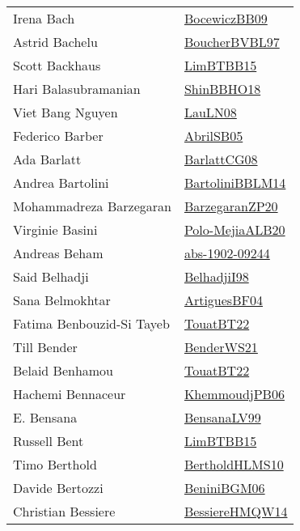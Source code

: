 {\begin{longtable}{p{4cm}p{20cm}}
Irena Bach & \href{}{BocewiczBB09}\cite{BocewiczBB09} \\
Astrid Bachelu & \href{}{BoucherBVBL97}\cite{BoucherBVBL97} \\
Scott Backhaus & \href{papers/LimBTBB15.pdf}{LimBTBB15}\cite{LimBTBB15} \\
Hari Balasubramanian & \href{articles/ShinBBHO18.pdf}{ShinBBHO18}\cite{ShinBBHO18} \\
Viet Bang Nguyen & \href{papers/LauLN08.pdf}{LauLN08}\cite{LauLN08} \\
Federico Barber & \href{papers/AbrilSB05.pdf}{AbrilSB05}\cite{AbrilSB05} \\
Ada Barlatt & \href{papers/BarlattCG08.pdf}{BarlattCG08}\cite{BarlattCG08} \\
Andrea Bartolini & \href{papers/BartoliniBBLM14.pdf}{BartoliniBBLM14}\cite{BartoliniBBLM14} \\
Mohammadreza Barzegaran & \href{papers/BarzegaranZP20.pdf}{BarzegaranZP20}\cite{BarzegaranZP20} \\
Virginie Basini & \href{}{Polo-MejiaALB20}\cite{Polo-MejiaALB20} \\
Andreas Beham & \href{articles/abs-1902-09244.pdf}{abs-1902-09244}\cite{abs-1902-09244} \\
Said Belhadji & \href{articles/BelhadjiI98.pdf}{BelhadjiI98}\cite{BelhadjiI98} \\
Sana Belmokhtar & \href{papers/ArtiguesBF04.pdf}{ArtiguesBF04}\cite{ArtiguesBF04} \\
Fatima Benbouzid{-}Si Tayeb & \href{}{TouatBT22}\cite{TouatBT22} \\
Till Bender & \href{papers/BenderWS21.pdf}{BenderWS21}\cite{BenderWS21} \\
Belaid Benhamou & \href{}{TouatBT22}\cite{TouatBT22} \\
Hachemi Bennaceur & \href{papers/KhemmoudjPB06.pdf}{KhemmoudjPB06}\cite{KhemmoudjPB06} \\
E. Bensana & \href{articles/BensanaLV99.pdf}{BensanaLV99}\cite{BensanaLV99} \\
Russell Bent & \href{papers/LimBTBB15.pdf}{LimBTBB15}\cite{LimBTBB15} \\
Timo Berthold & \href{papers/BertholdHLMS10.pdf}{BertholdHLMS10}\cite{BertholdHLMS10} \\
Davide Bertozzi & \href{papers/BeniniBGM06.pdf}{BeniniBGM06}\cite{BeniniBGM06} \\
Christian Bessiere & \href{papers/BessiereHMQW14.pdf}{BessiereHMQW14}\cite{BessiereHMQW14} \\

\end{longtable}}

